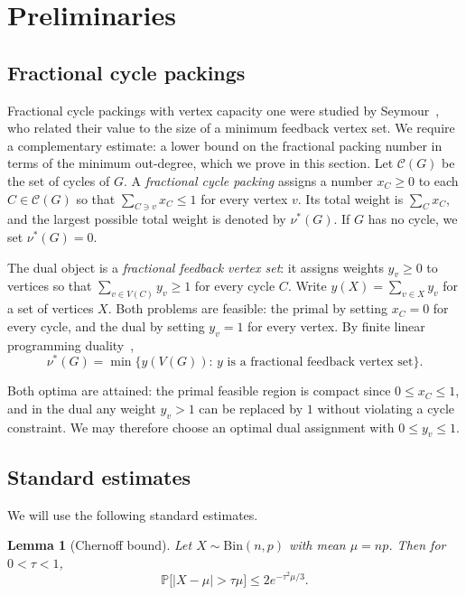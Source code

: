 \documentclass[a4paper,12pt]{article}
\newtheorem{lemma}[theorem]{Lemma}
\numberwithin{equation}{section}
\newcommand{\jbjcomment}[1]{\textcolor{blue}{JBJ: #1}}
\begin{document}
\section{Preliminaries}\label{sec:preliminaries}


\subsection{Fractional cycle packings}\label{subsec:fractional}


Fractional cycle packings with vertex capacity one were studied by
Seymour~\cite{seymourC15}, who related their value to the size of a minimum feedback
vertex set. We require a complementary estimate: a lower bound on the
fractional packing number in terms of the minimum out-degree, which we
prove in this section.
Let $\mathcal C(G)$ be the set of cycles of $G$.
A \emph{fractional cycle packing} assigns a number $x_C\ge0$ to
each $C\in\mathcal C(G)$ so that
$\sum_{C\ni v}x_C\le1$ for every vertex $v$. Its total weight is
$\sum_C x_C$, and the largest possible total weight is denoted by
$\nu^\ast(G)$. If $G$ has no cycle, we set $\nu^\ast(G)=0$.  


The dual object is a \emph{fractional feedback vertex set}: it assigns
weights $y_v\ge0$ to vertices so that
$\sum_{v\in V(C)}y_v\ge1$ for every cycle $C$.
Write $y(X)=\sum_{v\in X}y_v$ for a set of vertices $X$.
Both problems are feasible: the primal by setting $x_C=0$ for every
cycle, and the dual by setting $y_v=1$ for every vertex. By finite linear programming duality~\cite[Chapter~7]{schrijverTLIP1986},
\begin{equation}\label{eq:duality}
\nu^\ast(G)=\min\{y(V(G)):\,y\text{ is a fractional feedback vertex set}\}.
\end{equation} 

Both optima are attained: the primal feasible region is compact since
$0\le x_C\le 1$, and in the dual any weight $y_v>1$ can be replaced by
$1$ without violating a cycle constraint. We may therefore choose an
optimal dual assignment with $0\le y_v\le 1$.


\subsection{Standard estimates}\label{subsec:estimate}

We will use the following standard estimates. %


\begin{lemma}[Chernoff bound]\label{lem:chernoff}
Let $X\sim\mathrm{Bin}(n,p)$ with mean $\mu=np$. Then for $0<\tau<1$,
$$
\mathbb P\bigl[|X-\mu|>\tau\mu\bigr]\le2e^{-\tau^2\mu/3}.
$$
\end{lemma}
\end{document}
